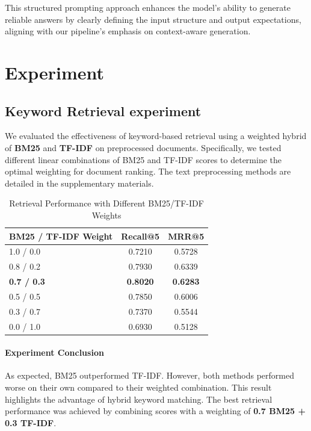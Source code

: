 \documentclass[twoside]{article}
\begin{document}
\vspace{0.5cm}

This structured prompting approach enhances the model's ability to generate reliable answers by clearly defining the input structure and output expectations, aligning with our pipeline's emphasis on context-aware generation.

\section{Experiment}
\subsection{Keyword Retrieval experiment}

We evaluated the effectiveness of keyword-based retrieval using a weighted hybrid of \textbf{BM25} and \textbf{TF-IDF} on preprocessed documents. Specifically, we tested different linear combinations of BM25 and TF-IDF scores to determine the optimal weighting for document ranking. The text preprocessing methods are detailed in the supplementary materials. 

\vspace{5pt}
\begin{table}[htbp]
\centering
\setlength{\tabcolsep}{10pt}
\begin{tabular}{p{3cm} c c}
\toprule
\textbf{BM25 / TF-IDF Weight} & \textbf{Recall@5} & \textbf{MRR@5} \\
\midrule
{1.0 / 0.0}               & 0.7210 & 0.5728 \\
{0.8 / 0.2}                 & 0.7930 & 0.6339 \\
\textbf{0.7 / 0.3}                 & \textbf{0.8020} & \textbf{0.6283} \\
0.5 / 0.5                          & 0.7850 & 0.6006 \\
0.3 / 0.7                          & 0.7370 & 0.5544 \\
0.0 / 1.0                          & 0.6930 & 0.5128 \\
\bottomrule
\end{tabular}
\caption{Retrieval Performance with Different BM25/TF-IDF Weights}
\end{table}
\vspace{5pt}

\paragraph*{Experiment Conclusion}
As expected, BM25 outperformed TF-IDF. However, both methods performed worse on their own compared to their weighted combination. This result highlights the advantage of hybrid keyword matching. The best retrieval performance was achieved by combining scores with a weighting of \textbf{0.7 BM25 + 0.3 TF-IDF}.
\end{document}
